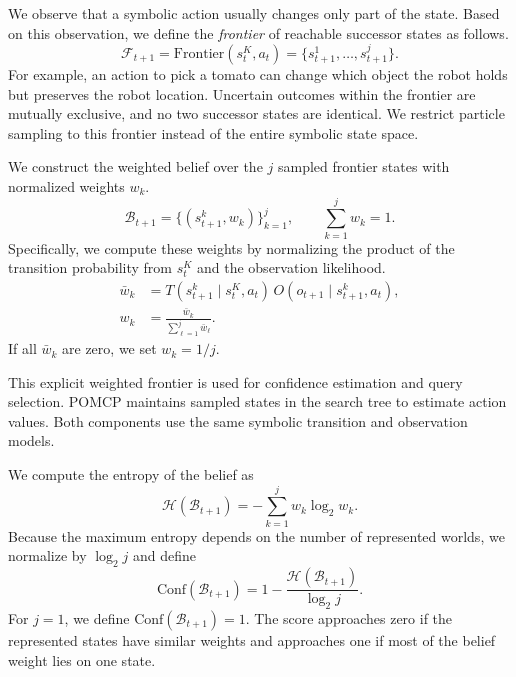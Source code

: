We observe that a symbolic action usually changes only part of the state. Based on this observation, we define the \textit{frontier} of reachable successor states as follows.
\begin{equation}
\mathcal{F}_{t+1} = \mathrm{Frontier}(s_t^{K},a_t) = \{s_{t+1}^{1},\ldots,s_{t+1}^{j}\}.
\label{eq:frontier}
\end{equation}
For example, an action to pick a tomato can change which object the robot holds but preserves the robot location. Uncertain outcomes within the frontier are mutually exclusive, and no two successor states are identical. We restrict particle sampling to this frontier instead of the entire symbolic state space.

We construct the weighted belief over the $j$ sampled frontier states with normalized weights $w_k$.
\begin{equation}
\mathcal{B}_{t+1}=\{(s_{t+1}^{k},w_k)\}_{k=1}^{j},
\qquad
\sum_{k=1}^{j}w_k=1.
\label{eq:symbolic_belief}
\end{equation}
Specifically, we compute these weights by normalizing the product of the transition probability from $s_t^{K}$ and the observation likelihood.
\begin{equation}
\begin{aligned}
\bar{w}_{k}
&=T(s_{t+1}^{k}\mid s_t^{K},a_t)\,
O(o_{t+1}\mid s_{t+1}^{k},a_t),\\
w_k&=\frac{\bar{w}_k}{\sum_{\ell=1}^{j}\bar{w}_{\ell}}.
\end{aligned}
\label{eq:belief_update}
\end{equation}
If all $\bar{w}_k$ are zero, we set $w_k=1/j$.

This explicit weighted frontier is used for confidence estimation and query selection. POMCP maintains sampled states in the search tree to estimate action values. Both components use the same symbolic transition and observation models.

We compute the entropy of the belief as
\[\mathcal{H}(\mathcal{B}_{t+1}) = -\sum_{k=1}^{j}w_k\log_2 w_k. \]
Because the maximum entropy depends on the number of represented worlds, we normalize by $\log_2 j$ and define
\begin{equation}
\mathrm{Conf}(\mathcal{B}_{t+1}) = 1-\frac{\mathcal{H}(\mathcal{B}_{t+1})}{\log_2 j}.
\label{eq:compute_confidence}
\end{equation}
For $j=1$, we define $\mathrm{Conf}(\mathcal{B}_{t+1})=1$. The score approaches zero if the represented states have similar weights and approaches one if most of the belief weight lies on one state.

